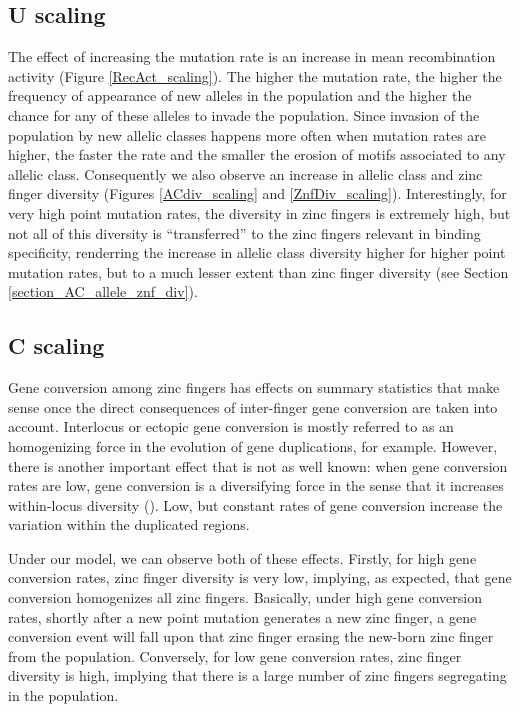 \documentclass[a4paper,10pt]{article}
\begin{document}
\subsection{U scaling}
The effect of increasing the mutation rate is an increase in mean recombination activity (Figure \ref{RecAct_scaling}). The higher the mutation rate, the higher the frequency of appearance of new alleles in the population and the higher the chance for any of these alleles to invade the population. Since invasion of the population by new allelic classes happens more often when mutation rates are higher, the faster the rate and the smaller the erosion of motifs associated to any allelic class. Consequently we also observe an increase in allelic class and zinc finger diversity  (Figures \ref{ACdiv_scaling} and \ref{ZnfDiv_scaling}). Interestingly, for very high point mutation rates, the diversity in zinc fingers is extremely high, but not all of this diversity is ``transferred'' to the zinc fingers relevant in binding specificity, renderring the increase in allelic class diversity higher for higher point mutation rates, but to a much lesser extent than zinc finger diversity (see Section \ref{section_AC_allele_znf_div}).


\subsection{C scaling}
Gene conversion among zinc fingers has effects on summary statistics that make sense once the direct consequences of inter-finger gene conversion are taken into account. Interlocus or ectopic gene conversion is mostly referred to as an homogenizing force in the evolution of gene duplications, for example. However, there is another important effect that is not as well known: when gene conversion rates are low, gene conversion is a diversifying force in the sense that it increases within-locus diversity (\cite{Innan2003, Hartasanchez2014}). Low, but constant rates of gene conversion increase the variation within the duplicated regions.

Under our model, we can observe both of these effects. Firstly, for high gene conversion rates, zinc finger diversity is very low, implying, as expected, that gene conversion homogenizes all zinc fingers. Basically, under high gene conversion rates, shortly after a new point mutation generates a new zinc finger, a gene conversion event will fall upon that zinc finger erasing the new-born zinc finger from the population. Conversely, for low gene conversion rates, zinc finger diversity is high, implying that there is a large number of zinc fingers segregating in the population. 
\end{document}
